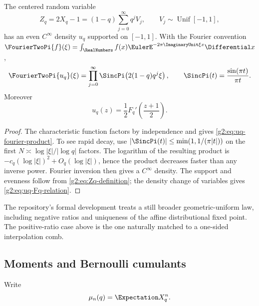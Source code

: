 \begin{proposition}
\label{g2:prop:uq-smooth}
The centered random variable
\begin{equation}
 Z_q=2X_q-1=(1-q)\sum_{j=0}^\infty q^jV_j,
 \qquad V_j\sim\operatorname{Unif}[-1,1],
 \label{g2:eq:Zq-definition}
\end{equation}
has an even $C^\infty$ density $u_q$ supported on $[-1,1]$.  With the Fourier
convention
$\FourierTwoPi{f}(\xi)=\int_\RealNumbers f(x)\EulerE^{-2\pi\ImaginaryUnit\xi x}\Differential x$,
\begin{equation}
 \FourierTwoPi{u_q}(\xi)=\prod_{j=0}^\infty
 \SincPi\!\left(2(1-q)q^j\xi\right),
 \qquad
 \SincPi(t)=\frac{\sin(\pi t)}{\pi t}.
 \label{g2:eq:uq-fourier-product}
\end{equation}
Moreover
\begin{equation}
 u_q(z)=\frac12F_q'\!\left(\frac{z+1}{2}\right).
 \label{g2:eq:uq-Fq-relation}
\end{equation}
\end{proposition}

\begin{proof}
The characteristic function factors by independence and gives
\eqref{g2:eq:uq-fourier-product}.  To see rapid decay, use
$|\SincPi(t)|\le\min(1,1/(\pi|t|))$ on the first
$N\asymp\log|\xi|/|\log q|$ factors.  The logarithm of the resulting product
is $-c_q(\log|\xi|)^2+O_q(\log|\xi|)$, hence the product decreases faster than
any inverse power.  Fourier inversion then gives a $C^\infty$ density.  The
support and evenness follow from \eqref{g2:eq:Zq-definition}; the density change
of variables gives \eqref{g2:eq:uq-Fq-relation}.
\end{proof}

\begin{remark}
The repository's formal development treats a still broader geometric-uniform
law, including negative ratios and uniqueness of the affine distributional
fixed point.  The positive-ratio case above is the one naturally matched to a
one-sided interpolation comb.
\end{remark}

\subsection{Moments and Bernoulli cumulants}

Write
\begin{equation}
 \mu_n(q)=\Expectation X_q^n.
 \label{g2:eq:muq-definition}
\end{equation}

